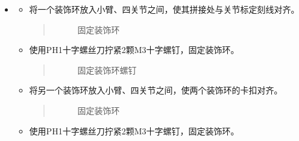 \documentclass[a4paper,11pt,english,openany,oneside]{sphinxmanual}
\begin{document}
\begin{itemize}
\begin{itemize}
\begin{quote}
\begin{figure}[H]
\centering
\capstart

\noindent{}
\caption{安装五关节闷盖}\label{\detokenize{_u66f4_u6362_u5173_u8282:id100}}\end{figure}
\end{quote}

\end{itemize}

\item {} 
\sphinxAtStartPar
{}
\begin{itemize}
\item {} 
\sphinxAtStartPar
将一个装饰环放入小臂、四关节之间，使其拼接处与关节标定刻线对齐。
\begin{quote}

\begin{figure}[H]
\centering
\capstart

\noindent{}
\caption{固定装饰环}\label{\detokenize{_u66f4_u6362_u5173_u8282:id101}}\end{figure}
\end{quote}

\item {} 
\sphinxAtStartPar
使用PH1十字螺丝刀拧紧2颗M3十字螺钉，固定装饰环。
\begin{quote}

\begin{figure}[H]
\centering
\capstart

\noindent{}
\caption{固定装饰环螺钉}\label{\detokenize{_u66f4_u6362_u5173_u8282:id102}}\end{figure}
\end{quote}

\item {} 
\sphinxAtStartPar
将另一个装饰环放入小臂、四关节之间，使两个装饰环的卡扣对齐。
\begin{quote}

\begin{figure}[H]
\centering
\capstart

\noindent{}
\caption{固定装饰环}\label{\detokenize{_u66f4_u6362_u5173_u8282:id103}}\end{figure}
\end{quote}

\item {} 
\sphinxAtStartPar
使用PH1十字螺丝刀拧紧2颗M3十字螺钉，固定装饰环。
\begin{quote}


\end{quote}
\end{itemize}
\end{itemize}
\end{document}

